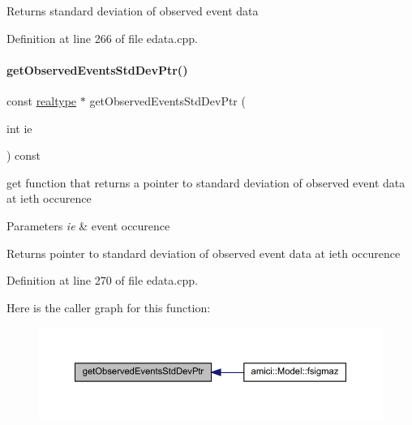\begin{DoxyReturn}{Returns}
standard deviation of observed event data 
\end{DoxyReturn}


Definition at line 266 of file edata.\+cpp.

\mbox{\label{classamici_1_1_exp_data_aabab4dfc080fdf961b6a3bbf1aebd631}} 
\paragraph{\texorpdfstring{get\+Observed\+Events\+Std\+Dev\+Ptr()}{getObservedEventsStdDevPtr()}}
{\footnotesize\ttfamily const \mbox{\hyperlink{namespaceamici_a1bdce28051d6a53868f7ccbf5f2c14a3}{realtype}} $\ast$ get\+Observed\+Events\+Std\+Dev\+Ptr (\begin{DoxyParamCaption}\item[{int}]{ie }\end{DoxyParamCaption}) const}

get function that returns a pointer to standard deviation of observed event data at ieth occurence


\begin{DoxyParams}{Parameters}
{\em ie} & event occurence \\
\hline
\end{DoxyParams}
\begin{DoxyReturn}{Returns}
pointer to standard deviation of observed event data at ieth occurence 
\end{DoxyReturn}


Definition at line 270 of file edata.\+cpp.

Here is the caller graph for this function\+:
\nopagebreak
\begin{figure}[H]
\begin{center}
\leavevmode
\includegraphics[width=350pt]{classamici_1_1_exp_data_aabab4dfc080fdf961b6a3bbf1aebd631_icgraph}
\end{center}
\end{figure}
\mbox{\label{classamici_1_1_exp_data_acad115e928a8b0bc8e90ebf9553d3eed}} 
